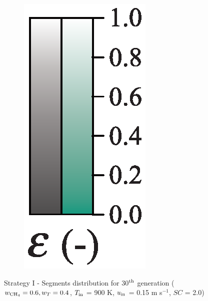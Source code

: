 \documentclass[preprint,12pt]{elsarticle}
\begin{document}
\begin{figure}
\begin{subfigure}[b]{0.1\textwidth}
     	\includegraphics[width=\textwidth]{segments_porosity.eps}
     \end{subfigure}
\caption{\label{fig:30L6040G1-TField} Strategy I - Segments distribution for 30$^{\rm{th}}$ generation ($w_{\rm{CH_4}} = 0.6, w_T = 0.4$, $T_{\rm{in}}$ = 900 K, $u_{\rm{in}}$ = 0.15 m s$^{-1}$, $SC$ = 2.0)}
\end{figure}
\end{document}

